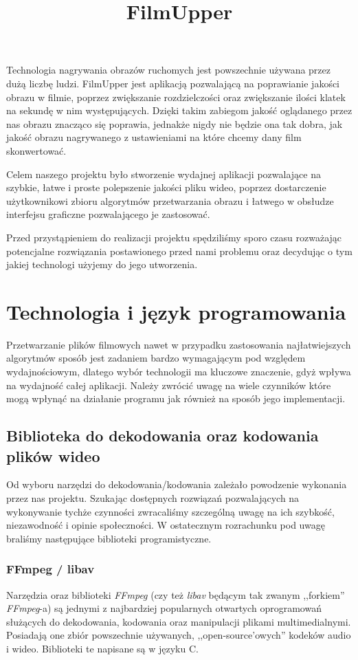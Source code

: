 \documentclass[twoside]{projektInzynierskiMS}
\title{FilmUpper}
\begin{document}
Technologia nagrywania obrazów ruchomych jest powszechnie używana przez dużą liczbę ludzi.
FilmUpper jest aplikacją pozwalającą na poprawianie jakości obrazu w filmie, poprzez zwiększanie rozdzielczości oraz zwiększanie ilości klatek na sekundę w nim występujących. Dzięki takim zabiegom jakość oglądanego przez nas obrazu znacząco się poprawia, jednakże nigdy nie będzie ona tak dobra, jak jakość obrazu nagrywanego z ustawieniami na które chcemy dany film skonwertować. 

Celem naszego projektu było stworzenie wydajnej aplikacji pozwalające na szybkie, łatwe i proste polepszenie jakości pliku wideo, poprzez dostarczenie użytkownikowi  zbioru algorytmów przetwarzania obrazu i łatwego w obsłudze interfejsu graficzne pozwalającego je zastosować. 

Przed przystąpieniem do realizacji projektu spędziliśmy sporo czasu rozważając potencjalne rozwiązania postawionego przed nami problemu oraz decydując o tym jakiej technologi użyjemy do jego utworzenia.


\section{Technologia i język programowania}


Przetwarzanie plików filmowych nawet w przypadku zastosowania najłatwiejszych algorytmów sposób jest zadaniem bardzo wymagającym pod względem wydajnościowym, dlatego wybór technologii ma kluczowe znaczenie, gdyż wpływa na wydajność całej aplikacji. Należy zwrócić uwagę na wiele czynników które mogą wpłynąć na działanie programu jak również na sposób jego implementacji.

\subsection{Biblioteka do dekodowania oraz kodowania plików wideo}
Od wyboru narzędzi do dekodowania/kodowania zależało powodzenie wykonania przez nas projektu. Szukając dostępnych rozwiązań pozwalających na wykonywanie tychże czynności zwracaliśmy szczególną uwagę na ich szybkość, niezawodność i opinie społeczności. W ostatecznym rozrachunku pod uwagę braliśmy następujące biblioteki programistyczne.
\subsubsection{FFmpeg / libav}
Narzędzia oraz biblioteki \emph{FFmpeg} (czy też \emph{libav} będącym tak zwanym ,,forkiem'' \emph{FFmpeg}-a) są jednymi z najbardziej popularnych otwartych oprogramowań służących do dekodowania, kodowania oraz manipulacji plikami multimedialnymi. Posiadają one zbiór powszechnie używanych, ,,open-source'owych'' kodeków audio i wideo. Biblioteki te napisane są w języku C. 
\end{document}
